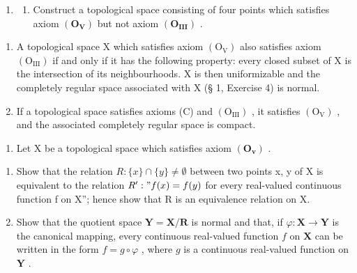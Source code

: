 \ExerciseSection

\begin{enumerate}
\def\labelenumi{\roman{enumi})}
\tightlist
\item
  \begin{enumerate}
  \def\labelenumii{\alph{enumii})}
  \tightlist
  \item
    Construct a topological space consisting of four points which satisfies axiom \((\mathbf{O}_{\mathbf{V}})\) but not axiom \((\mathbf{O}_{\mathbf{III}})\) .
  \end{enumerate}
\end{enumerate}

\begin{enumerate}
\def\labelenumi{\alph{enumi})}
\setcounter{enumi}{1}
\item
  A topological space X which satisfies axiom \((\mathrm{O}_{\mathrm{V}})\) also satisfies axiom \((\mathrm{O}_{\mathrm{III}})\) if and only if it has the following property: every closed subset of X is the intersection of its neighbourhoods. X is then uniformizable and the completely regular space associated with X (§ 1, Exercise 4) is normal.
\item
  If a topological space satisfies axioms (C) and \((\mathrm{O}_{\mathrm{III}})\) , it satisfies \((\mathrm{O}_{\mathrm{V}})\) , and the associated completely regular space is compact.
\end{enumerate}

\begin{enumerate}
\def\labelenumi{\arabic{enumi})}
\setcounter{enumi}{1}
\tightlist
\item
  Let X be a topological space which satisfies axiom \((\mathbf{O}_{\mathbf{v}})\) .
\end{enumerate}

\begin{enumerate}
\def\labelenumi{\alph{enumi})}
\item
  Show that the relation \(R: \{x\} \cap \{y\} \neq \emptyset\) between two points x, y of X is equivalent to the relation \(R' : "f(x) = f(y)\) for every real-valued continuous function f on X''; hence show that R is an equivalence relation on X.
\item
  Show that the quotient space \(\mathbf{Y} = \mathbf{X} / \mathbf{R}\) is normal and that, if \(\varphi: \mathbf{X} \to \mathbf{Y}\) is the canonical mapping, every continuous real-valued function \(f\) on \(\mathbf{X}\) can be written in the form \(f = g \circ \varphi\) , where \(g\) is a continuous real-valued function on \(\mathbf{Y}\) .
\end{enumerate}

